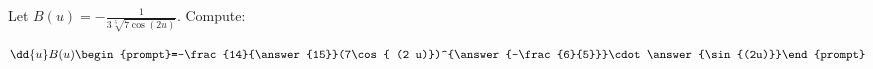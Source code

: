 \documentclass{ximera}
\author{Bart Snapp\ Nela Lakos}
\begin{document}
\begin{exercise}
Let $B(u) = -\frac{1}{3 \sqrt[5]{7\cos (2 u)}}$. Compute:

\[
\dd{u}B(u)
\begin{prompt}=-\frac{14}{\answer{15}}(7\cos{ (2 u)})^{\answer{-\frac{6}{5}}}\cdot \answer{\sin{(2u)}}\end{prompt}
\]
\end{exercise}
\end{document}
